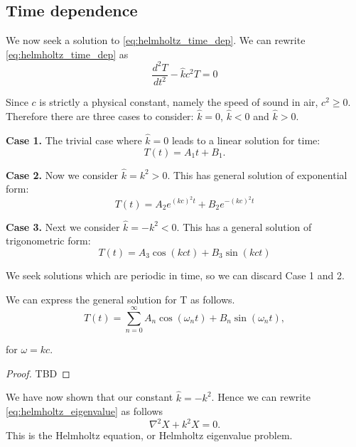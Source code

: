 \subsection{Time dependence}\label{ss:time_dependece}
We now seek a solution to \eqref{eq:helmholtz_time_dep}. We can rewrite \eqref{eq:helmholtz_time_dep} as 
    \begin{equation}\label{eq:helmholtz_time_dep_1}
        \frac{d^2 T}{dt^2} - \hat{k}c^2 T = 0
    \end{equation}\par
%
Since $c$ is strictly a physical constant, namely the speed of sound in air, $c^2 \geq 0$. Therefore there are three cases to consider: $\hat{k} = 0$, $\hat{k} < 0$ and $\hat{k} > 0$.\par
%
\textbf{Case 1.} The trivial case where $\hat{k} = 0$ leads to a linear solution for time:
    \begin{equation}
        T(t) = A_1 t + B_1.
    \end{equation}\par
%
\textbf{Case 2.} Now we consider $\hat{k} = k^2 > 0$. This has general solution of exponential form:
    \begin{equation}
        T(t) = A_2 e^{(kc)^2 t} + B_2 e^{-(kc)^2t}
    \end{equation}\par
%
\textbf{Case 3.} Next we consider $\hat{k}= -k^2 <0$. This has a general solution of trigonometric form:
    \begin{equation}
        T(t) = A_3 \cos(kct) + B_3 \sin(kct) 
    \end{equation}
\par
%
We seek solutions which are periodic in time, so we can discard Case 1 and 2. \par
%
    \begin{propn} \label{propn:trig_sum_solution}
    We can express the general solution for T as follows. 
        \begin{equation}\label{eq:helmholtz_time_sum}
            T(t) = \sum^\infty_{n = 0} A_n \cos(\omega_n t) + B_n \sin(\omega_n t),
        \end{equation}
    \end{propn}
    for $\omega = kc.$
    \begin{proof}
    TBD
    \end{proof}\par
%
We have now shown that our constant $\hat{k} = - k^2$. Hence we can rewrite \eqref{eq:helmholtz_eigenvalue} as follows
    \begin{equation}\label{eq:helmholtz}
        \nabla^2 X + k^2X = 0.
    \end{equation}
This is the Helmholtz equation, or Helmholtz eigenvalue problem.
%
